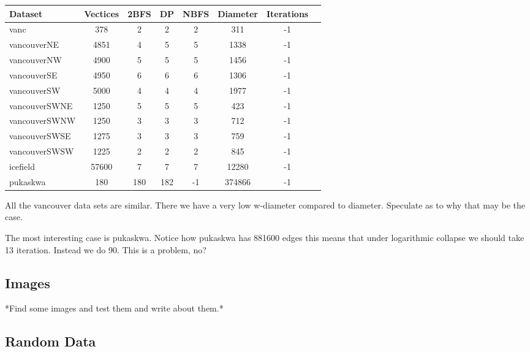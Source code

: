 \begin{center}
\begin{tabular}{l*{6}{c}r}
Dataset             & Vectices  & 2BFS  & DP    & NBFS  & Diameter  & Iterations\\
\hline
vanc                & 378       & 2     & 2     & 2     & 311       & -1 \\
vancouverNE         & 4851      & 4     & 5     & 5     & 1338      & -1 \\
vancouverNW         & 4900      & 5     & 5     & 5     & 1456      & -1 \\
vancouverSE         & 4950      & 6     & 6     & 6     & 1306      & -1 \\
vancouverSW         & 5000      & 4     & 4     & 4     & 1977      & -1 \\
vancouverSWNE       & 1250      & 5     & 5     & 5     & 423       & -1 \\
vancouverSWNW       & 1250      & 3     & 3     & 3     & 712       & -1 \\
vancouverSWSE       & 1275      & 3     & 3     & 3     & 759       & -1 \\
vancouverSWSW       & 1225      & 2     & 2     & 2     & 845       & -1 \\
icefield            & 57600     & 7     & 7     & 7     & 12280     & -1 \\
pukaskwa            & 180       & 180   & 182   & -1    & 374866    & -1 \\

\end{tabular}
\end{center}

All the vancouver data sets are similar. There we have a very low w-diameter compared to diameter. Speculate as to why that may be the case.

The most interesting case is pukaskwa. Notice how pukaskwa has 881600 edges this means that under logarithmic collapse we should take 13 iteration. Instead we do 90. This is a problem, no?

\subsection{Images}

*Find some images and test them and write about them.*

\subsection{Random Data}

